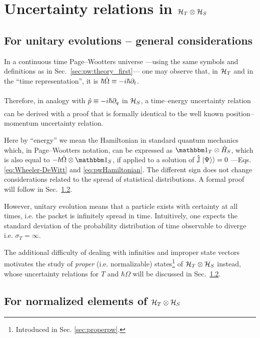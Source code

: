 \section{Uncertainty relations in $\mathcal{H}_T \otimes \mathcal{H}_S$}\label{sec:pw:uncertainty}

\subsection{For unitary evolutions -- general considerations}
\label{sec:pw:unitary-general}

In a continuous time Page--Wootters universe
---using the same symbols and definitions as in Sec.~\ref{sec:pw:theory_first}---
one may observe that,
in $\mathcal{H}_T$ and in the ``time representation'',
it is $\hbar\hat{\Omega} \underset{}{\equiv} -i\hbar\partial_{t}$.

Therefore, in analogy with $\hat{p} \underset{}{\equiv} -i\hbar\partial_{q}$ in $\mathcal{H}_S$,
a time--energy uncertainty relation can be derived
with a proof that is formally identical to the well known
position--momentum uncertainty relation.

Here by ``energy'' we mean the Hamiltonian in standard quantum mechanics which,
in Page--Wootters notation,
can be expressed as $\idop_T \ox \op{H}_S$, which is also equal to
$-\hbar\op{\Omega} \ox \idop_S$,
if applied to a solution of $\hat{\mathbb{J}}\left.\left| \Psi \right\rangle\right\rangle = 0$
---Eqs. \eqref{eq:Wheeler-DeWitt} and \eqref{eq:pwHamiltonian}.
The different sign does not change considerations related to the spread of statistical distributions.
A formal proof will follow in Sec.~\ref{sec:for-normalized-elements}.

However, unitary evolution means that a particle exists with
certainty at all times, i.e. the packet
is infinitely spread in time.
Intuitively,
one expects the standard deviation
of the probability distribution of time observable
to diverge i.e.
$\sigma_T = \infty$.

The additional difficulty of dealing with infinities and improper state vectors
motivates the study of \emph{proper} (i.e. normalizable) states\footnote{
  Introduced in Sec. \ref{sec:properpw}.
}
of $\mathcal{H}_T \otimes \mathcal{H}_S$
instead, whose uncertainty relations for $T$ and $\hbar\Omega$ will be discussed in Sec.~\ref{sec:for-normalized-elements}.

\subsection{For normalized elements of $\mathcal{H}_T \otimes \mathcal{H}_S$}\label{sec:for-normalized-elements}

